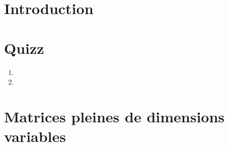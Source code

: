 \documentclass[ds]{sujet}
\begin{document}
\formation{} 
\matiere{}  
\auteur{} 
\def\SujetClsNumero{1}
\section*{Introduction}

\section{Quizz}
\begin{enumerate}
\item
\item
\end{enumerate}

\section{Matrices pleines de dimensions variables}


\end{document}
